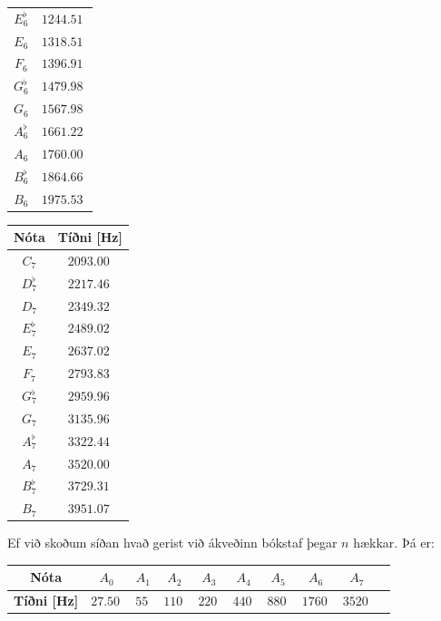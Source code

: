 \ifdefined \wholebook \else\documentclass[oneside]{book}\usepackage{EdlBook}\graphicspath{{figures/}}
\begin{document}
\begin{table}[H]
\begin{center}
\begin{tabular}{|c|c|}
$E^\flat_6$ & $\SI{1244.51}{}$ \\
$E_6$ & $\SI{1318.51}{}$ \\
$F_6$ & $\SI{1396.91}{}$ \\
$G^\flat_6$ & $\SI{1479.98}{}$ \\
$G_6$ & $\SI{1567.98}{}$ \\
$A^\flat_6$ & $\SI{1661.22}{}$ \\
$A_6$ & $\SI{1760.00}{}$ \\
$B^\flat_6$ & $\SI{1864.66}{}$ \\
$B_6$ & $\SI{1975.53}{}$ \\
\hline
\end{tabular}
\quad
\begin{tabular}{|c|c|}
\hline
\textbf{Nóta} & \textbf{Tíðni [Hz]} \\
\hline
\hline
$C_7$ & $\SI{2093.00}{}$ \\
$D^\flat_7$ & $\SI{2217.46}{}$ \\
$D_7$ & $\SI{2349.32}{}$ \\
$E^\flat_7$ & $\SI{2489.02}{}$ \\
$E_7$ & $\SI{2637.02}{}$ \\
$F_7$ & $\SI{2793.83}{}$ \\
$G^\flat_7$ & $\SI{2959.96}{}$ \\
$G_7$ & $\SI{3135.96}{}$ \\
$A^\flat_7$ & $\SI{3322.44}{}$ \\
$A_7$ & $\SI{3520.00}{}$ \\
$B^\flat_7$ & $\SI{3729.31}{}$ \\
$B_7$ & $\SI{3951.07}{}$ \\
\hline
\end{tabular}
\end{center}
\end{table}

Ef við skoðum síðan hvað gerist við ákveðinn bókstaf þegar $n$ hækkar. Þá er:

\begin{table}[H]
    \centering
\begin{tabular}{|c|c|c|c|c|c|c|c|c|c|}
\hline
\textbf{Nóta} & $A_0$ & $A_1$ & $A_2$ & $A_3$ & $A_4$ & $A_5$ & $A_6$ & $A_7$ \\
\hline
\textbf{Tíðni [Hz]} & $\SI{27.50}{}$ & $\SI{55}{}$ & $\SI{110}{}$ & $\SI{220}{}$ & $\SI{440}{}$ & $\SI{880}{}$ & $\SI{1760}{}$ & $\SI{3520}{}$ \\
\hline
\end{tabular}
\end{table}
\end{document}
